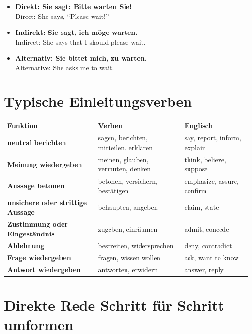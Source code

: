 \documentclass[a4paper,11pt]{article}
\newcommand{\ExampleItem}[2]{\item \textbf{#1}\\{\small\color{SoftGray}#2}}
\begin{document}
            \begin{exbox}
                \begin{itemize}
                    \ExampleItem{Direkt: Sie sagt: \glqq Bitte warten Sie!\grqq}{Direct: She says, ``Please wait!''}
                    \ExampleItem{Indirekt: Sie sagt, ich möge warten.}{Indirect: She says that I should please wait.}
                    \ExampleItem{Alternativ: Sie bittet mich, zu warten.}{Alternative: She asks me to wait.}
                \end{itemize}
            \end{exbox}


    \section{Typische Einleitungsverben}

        \begin{longtable}{>{\bfseries}p{4.0cm}|p{4.8cm}|p{5.0cm}}
            \rowcolor{HeaderBlueDark}
            \color{white}\textbf{Funktion} &
            \color{white}\textbf{Verben} &
            \color{white}\textbf{Englisch} \\
            neutral berichten & sagen, berichten, mitteilen, erklären & say, report, inform, explain \\
            Meinung wiedergeben & meinen, glauben, vermuten, denken & think, believe, suppose \\
            Aussage betonen & betonen, versichern, bestätigen & emphasize, assure, confirm \\
            unsichere oder strittige Aussage & behaupten, angeben & claim, state \\
            Zustimmung oder Eingeständnis & zugeben, einräumen & admit, concede \\
            Ablehnung & bestreiten, widersprechen & deny, contradict \\
            Frage wiedergeben & fragen, wissen wollen & ask, want to know \\
            Antwort wiedergeben & antworten, erwidern & answer, reply \\
        \end{longtable}


    \section{Direkte Rede Schritt für Schritt umformen}
\end{document}
